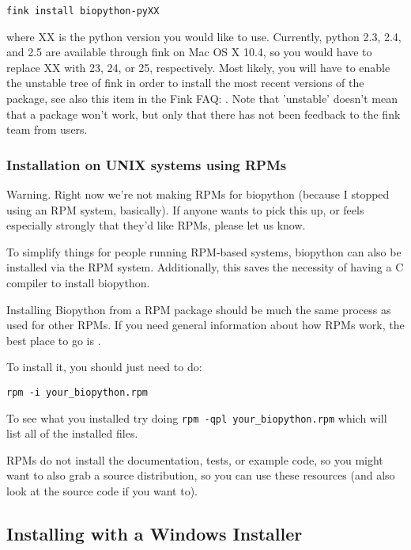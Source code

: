 \documentclass{article}
\begin{document}
\begin{verbatim}
fink install biopython-pyXX
\end{verbatim}

\noindent where XX is the python version you would like to use. Currently, python 2.3, 2.4, and 2.5 are available through fink on Mac OS X 10.4, so you would have to replace XX with 23, 24, or 25, respectively. Most likely, you will have to enable the unstable tree of fink in order to install the most recent versions of the package, see also this item in the Fink FAQ: . Note that 'unstable' doesn't mean that a package won't work, but only that there has not been feedback to the fink team from users.

\subsubsection{Installation on UNIX systems using RPMs}

Warning. Right now we're not making RPMs for biopython (because I
stopped using an RPM system, basically). If anyone wants to pick this
up, or feels especially strongly that they'd like RPMs, please let us
know.

To simplify things for people running RPM-based systems, biopython can
also be installed via the RPM system. Additionally, this saves the 
necessity of having a C compiler to install biopython. 

Installing Biopython from a RPM package should be much the same process as used for other RPMs. If you need general information about how RPMs work, the best place to go is .

To install it, you should just need to do:

\begin{verbatim}
rpm -i your_biopython.rpm
\end{verbatim}

To see what you installed try doing \verb|rpm -qpl your_biopython.rpm| which will list all of the installed files.

RPMs do not install the documentation, tests, or example code, so you might want to also grab a source distribution, so you can use these resources (and also look at the source code if you want to).

\subsection{Installing with a Windows Installer}
\end{document}
